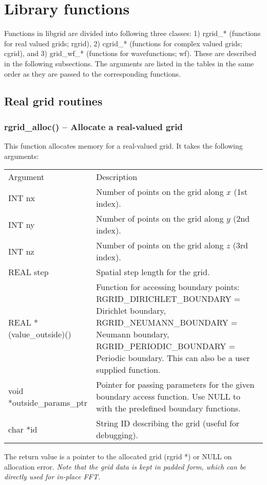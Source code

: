 \documentclass[12pt,letterpaper]{report}
\begin{document}
\chapter{Library functions}

Functions in libgrid are divided into following three classes: 1) rgrid\_* (functions for real valued grids; rgrid), 2) cgrid\_* (functions for complex valued grids; cgrid), and 3) grid\_wf\_* (functions for wavefunctions; wf). These are described in the following subsections. The arguments are listed in the tables in the same order as they are passed to the corresponding functions.

\section{Real grid routines}

\subsection{rgrid\_alloc() -- Allocate a real-valued grid}

This function allocates memory for a real-valued grid. It takes the following arguments:
\begin{longtable}{p{} p{}}
Argument & Description\\
\cline{1-2}
INT nx & Number of points on the grid along $x$ (1st index).\\
INT ny & Number of points on the grid along $y$ (2nd index).\\
INT nz & Number of points on the grid along $z$ (3rd index).\\
REAL step & Spatial step length for the grid.\\
REAL *(value\_outside)() & Function for accessing boundary points: RGRID\_DIRICHLET\_BOUNDARY = Dirichlet boundary, RGRID\_NEUMANN\_BOUNDARY = Neumann boundary, RGRID\_PERIODIC\_BOUNDARY  = Periodic boundary. This can also be a user supplied function.\\
void *outside\_params\_ptr & Pointer for passing parameters for the given boundary access function. Use NULL to with the predefined boundary functions.\\
char *id & String ID describing the grid (useful for debugging).
\end{longtable}
\noindent
The return value is a pointer to the allocated grid (rgrid *) or NULL on allocation error. \textit{Note that the grid data is kept in padded form, which can be directly used for in-place FFT.}
\end{document}

